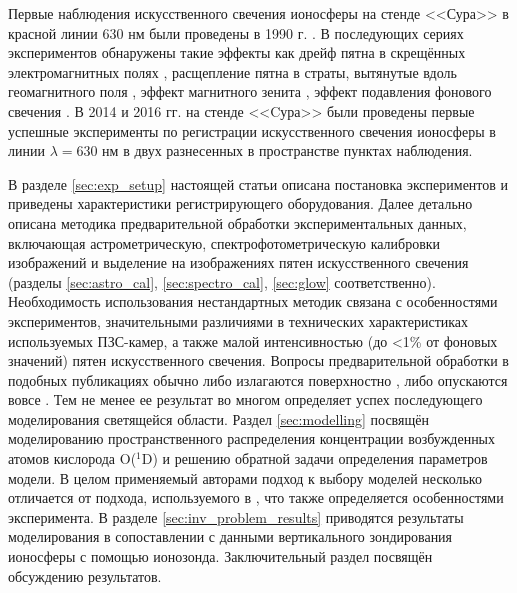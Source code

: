 \documentclass[12pt,a4paper]{article}
\begin{document}
Первые наблюдения искусственного свечения ионосферы на стенде <<Сура>> в красной линии 630 нм были проведены в 1990 г. \cite{BERNHARDTSCALESGRACHEtAl1991}. В последующих сериях экспериментов обнаружены такие эффекты как дрейф пятна в скрещённых электромагнитных полях \cite{BernhardtWongHubaEtAl2000}, расщепление пятна в страты, вытянутые вдоль геомагнитного поля \cite{GrachKoschYashnovEtAl2007, Grach2012}, эффект магнитного зенита \cite{Grach2012, Shindin2014}, эффект подавления фонового свечения \cite{Grach2012, Shindin2014, Klimenko2017}. В 2014 и 2016 гг. на стенде <<Cура>> были проведены первые успешные эксперименты по регистрации искусственного свечения ионосферы в линии $\lambda = 630$ нм в двух разнесенных в пространстве пунктах наблюдения.

В разделе \ref{sec:exp_setup} настоящей статьи описана постановка экспериментов и приведены характеристики регистрирующего оборудования. Далее детально описана методика предварительной обработки экспериментальных данных, включающая астрометрическую, спектрофотометрическую калибровки изображений и выделение на изображениях пятен искусственного свечения (разделы \ref{sec:astro_cal}, \ref{sec:spectro_cal}, \ref{sec:glow} соответственно). Необходимость использования нестандартных методик связана с особенностями экспериментов, значительными различиями в технических характеристиках используемых ПЗС-камер, а также малой интенсивностью (до <1\% от фоновых значений) пятен искусственного свечения. Вопросы предварительной обработки в подобных публикациях обычно либо излагаются поверхностно \cite{Gustavsson2008}, либо опускаются вовсе \cite{Pedersen2011}. Тем не менее ее результат во многом определяет успех последующего моделирования светящейся области. Раздел \ref{sec:modelling} посвящён моделированию пространственного распределения концентрации возбужденных атомов кислорода O($^1$D) и решению обратной задачи определения параметров модели. В целом применяемый авторами подход к выбору моделей несколько отличается от подхода, используемого в \cite{Gustavsson2001, Gustavsson2008}, что также определяется особенностями эксперимента. В разделе \ref{sec:inv_problem_results} приводятся результаты моделирования в сопоставлении с данными вертикального зондирования ионосферы с помощью ионозонда. Заключительный раздел посвящён обсуждению результатов.

\end{document}

